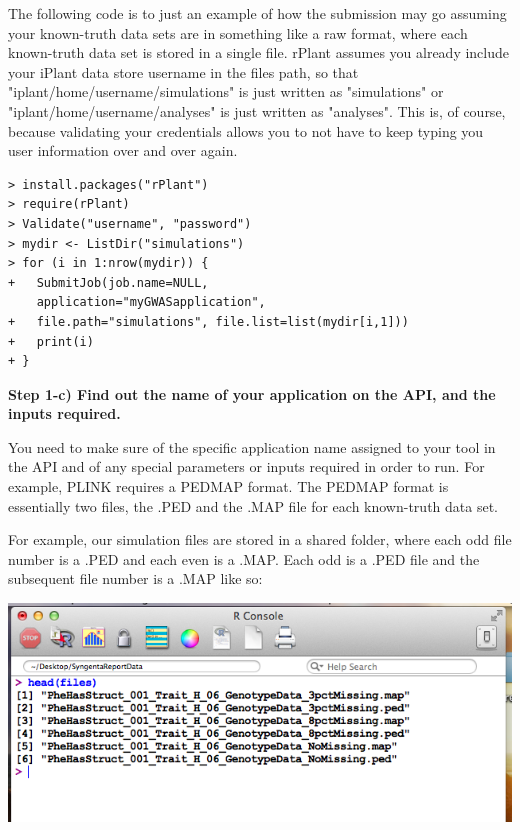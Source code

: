 \documentclass[twoside,a4paper]{refart}
\begin{document}
The following code is to just an example of how the submission may go assuming your known-truth data sets are in something like a raw format, where each known-truth data set is stored in a single file. rPlant assumes you already include your iPlant data store username in the files path, so that "iplant/home/username/simulations" is just written as "simulations" or "iplant/home/username/analyses" is just written as "analyses". This is, of course, because validating your credentials allows you to not have to keep typing you user information over and over again. 


\begin{lstlisting}[frame=single]
> install.packages("rPlant")
> require(rPlant)
> Validate("username", "password")
> mydir <- ListDir("simulations")
> for (i in 1:nrow(mydir)) {
+	SubmitJob(job.name=NULL,
	application="myGWASapplication", 
+	file.path="simulations", file.list=list(mydir[i,1]))
+	print(i)
+ }
\end{lstlisting} 

\textbf{Step 1-c) Find out the name of your application on the API, and the inputs required.} 

\vspace{-1mm}

You need to make sure of the specific application name assigned to your tool in the API and of any special parameters or inputs required in order to run. For example, PLINK requires a PEDMAP format. The PEDMAP format is essentially two files, the .PED and the .MAP file for each known-truth data set. 

For example, our simulation files are stored in a shared folder, where each odd file number is a .PED and each even is a .MAP. Each odd is a .PED file and the subsequent file number is a .MAP like so:
\begin{center}
	\includegraphics[width=\textwidth]{doc_step1_2}
\end{center}
\end{document}

